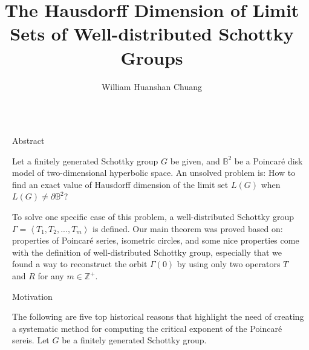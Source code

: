 \documentclass[final]{beamer}
\title{The Hausdorff Dimension of Limit Sets of Well-distributed Schottky Groups} %
\author{William Huanshan Chuang} %
\institute{Mathematics Department, San Francisco State University} %
\newlength{\sepwid}
\newlength{\onecolwid}
\begin{document}

\setlength{\belowcaptionskip}{2ex} %
\setlength\belowdisplayshortskip{2ex} %
	
\begin{frame}[t] %

\begin{columns}[t]%

\begin{column}{\sepwid}\end{column}%


\begin{column}{\onecolwid} %


\begin{alertblock}{Abstract}
\begin{small}
Let a finitely generated Schottky group $G$ be given, and $\mathbb{B}^2$ be a Poincar\'{e} disk model of two-dimensional hyperbolic space. An unsolved problem is: How to find an exact value of Hausdorff dimension of the limit set $L(G)$ when $L(G)\neq \partial \mathbb{B}^2$? 

To solve one specific case of this problem, a well-distributed Schottky group $\Gamma=\left\langle T_1,T_2,...,T_m\right\rangle$ is defined. Our main theorem was proved based on: properties of Poincar\'{e} series, isometric circles, and some nice properties come with the definition of well-distributed Schottky group, especially that we found a way to reconstruct the orbit $\Gamma(0)$ by using only two operators $T$ and $R$ for any $m\in\mathbb{Z}^+$. 

\end{small}
\end{alertblock}

\begin{block}{Motivation}
\begin{small}
The following are five top historical reasons that highlight the need of creating a systematic method for computing the critical exponent of the Poincar\'{e} sereis. Let $G$ be a finitely generated Schottky group. 


\end{small}
\end{block}
\end{column}
\end{columns}
\end{frame}
\end{document}
